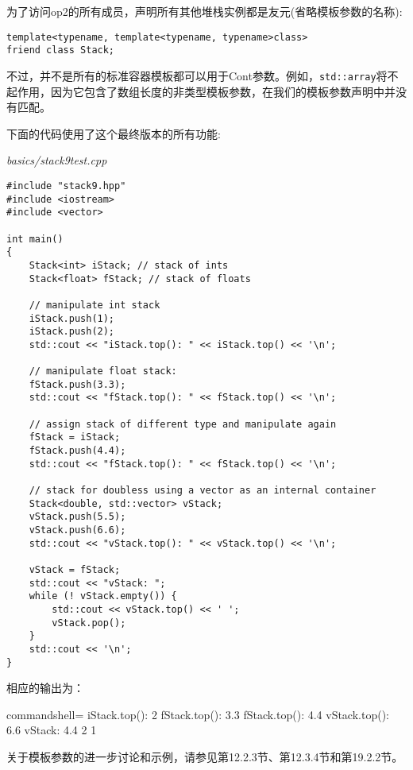 为了访问op2的所有成员，声明所有其他堆栈实例都是友元(省略模板参数的名称):

\begin{lstlisting}[style=styleCXX]
template<typename, template<typename, typename>class>
friend class Stack;
\end{lstlisting}

不过，并不是所有的标准容器模板都可以用于Cont参数。例如，\texttt{std::array}将不起作用，因为它包含了数组长度的非类型模板参数，在我们的模板参数声明中并没有匹配。

下面的代码使用了这个最终版本的所有功能:

\noindent
\textit{basics/stack9test.cpp}
\begin{lstlisting}[style=styleCXX]
#include "stack9.hpp"
#include <iostream>
#include <vector>

int main()
{
	Stack<int> iStack; // stack of ints
	Stack<float> fStack; // stack of floats
	
	// manipulate int stack
	iStack.push(1);
	iStack.push(2);
	std::cout << "iStack.top(): " << iStack.top() << '\n';
	
	// manipulate float stack:
	fStack.push(3.3);
	std::cout << "fStack.top(): " << fStack.top() << '\n';
	
	// assign stack of different type and manipulate again
	fStack = iStack;
	fStack.push(4.4);
	std::cout << "fStack.top(): " << fStack.top() << '\n';
	
	// stack for doubless using a vector as an internal container
	Stack<double, std::vector> vStack;
	vStack.push(5.5);
	vStack.push(6.6);
	std::cout << "vStack.top(): " << vStack.top() << '\n';
	
	vStack = fStack;
	std::cout << "vStack: ";
	while (! vStack.empty()) {
		std::cout << vStack.top() << ' ';
		vStack.pop();
	}
	std::cout << '\n';
}
\end{lstlisting}

相应的输出为：

\begin{tcblisting}{commandshell={}}
iStack.top(): 2
fStack.top(): 3.3
fStack.top(): 4.4
vStack.top(): 6.6
vStack: 4.4 2 1
\end{tcblisting}

关于模板参数的进一步讨论和示例，请参见第12.2.3节、第12.3.4节和第19.2.2节。





















